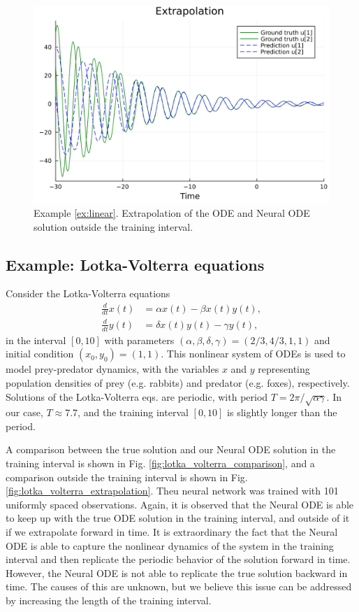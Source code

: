\documentclass[final,onefignum,onetabnum]{siamart220329}
\newcounter{example}
\begin{document}
\begin{figure}[h!]
	\centering
	\includegraphics[width=0.5\linewidth]{../examples/linear/extrapolation}
	\caption{Example \ref{ex:linear}. Extrapolation of the ODE and Neural ODE solution outside the training interval.}
	\label{fig:linear_extrapolation}
\end{figure}

\subsection{Example: Lotka-Volterra equations}\label{ex:lotka_volterra}
Consider the Lotka-Volterra equations
\begin{align}
	\frac{d}{dt}x(t) &= \alpha x(t) - \beta x(t) y(t),\\
	\frac{d}{dt}y(t) &= \delta x(t)y(t) - \gamma y(t),
\end{align}
in the interval $[0,10]$ with parameters $(\alpha, \beta, \delta, \gamma) = (2/3, 4/3, 1, 1)$ and initial condition $(x_0,y_0) = (1,1)$. This nonlinear system of ODEs is used to model prey-predator dynamics, with the variables $x$ and $y$ representing population densities of prey (e.g. rabbits) and predator (e.g. foxes), respectively. Solutions of the Lotka-Volterra eqs. are periodic, with period $T = 2\pi/\sqrt{\alpha\gamma}$. In our case, $T \approx 7.7 $, and the training interval $[0,10]$ is slightly longer than the period.

A comparison between the true solution and our Neural ODE solution in the training interval is shown in Fig. \ref{fig:lotka_volterra_comparison}, and a comparison outside the training interval is shown in Fig. \ref{fig:lotka_volterra_extrapolation}. Theu neural network was trained with 101 uniformly spaced observations. Again, it is observed that the Neural ODE is able to keep up with the true ODE solution in the training interval, and outside of it if we extrapolate forward in time. It is extraordinary the fact that the Neural ODE is able to capture the nonlinear dynamics of the system in the training interval and then replicate the periodic behavior of the solution forward in time. However, the Neural ODE is not able to replicate the true solution backward in time. The causes of this are unknown, but we believe this issue can be addressed by increasing the length of the training interval.
\end{document}

